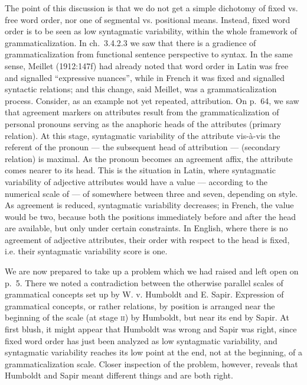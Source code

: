 The point of this discussion is that we do not get a simple dichotomy of fixed vs. free word order, nor one of segmental vs. positional means. Instead, fixed word order is to be seen as low syntagmatic variability, within the whole framework of grammaticalization. In ch.~3.4.2.3 we saw that there is a gradience of grammaticalization from functional sentence perspective to syntax. In the same sense, Meillet (1912:147f) had already noted that word order in Latin was free and signalled “expressive nuances”, while in French it was fixed and signalled syntactic relations; and this change, said Meillet, was a grammaticalization process. Consider, as an example not yet repeated, attribution. On p.~64, we saw that agreement markers on attributes result from the grammaticalization of personal pronouns serving as the anaphoric heads of the attributes (primary relation). At this stage, syntagmatic variability of the attribute vis-à-vis the referent of the pronoun — the subsequent head of attribution — (secondary relation) is maximal. As the pronoun becomes an agreement affix, the attribute comes nearer to its head. This is the situation in Latin, where syntagmatic variability of adjective attributes would have a value — according to the numerical scale of  — of somewhere between three and seven, depending on style. As agreement is reduced, syntagmatic variability decreases; in French, the value would be two, because both the positions immediately before and after the head are available, but only under certain constraints. In English, where there is no agreement of adjective attributes, their order with respect to the head is fixed, i.e. their syntagmatic variability score is one.

We are now prepared to take up a problem which we had raised and left open on p.~5. There we noted a contradiction between the otherwise parallel scales of grammatical concepts set up by W. v. Humboldt and E. Sapir. Expression of grammatical concepts, or rather relations, by position is arranged near the beginning of the scale (at stage \textsc{ii}) by Humboldt, but near its end by Sapir. At first blush, it might appear that Humboldt was wrong and Sapir was right, since fixed word order has just been analyzed as low syntagmatic variability, and syntagmatic variability reaches its low point at the end, not at the beginning, of a grammaticalization scale. Closer inspection of the problem, however, reveals that Humboldt and Sapir meant different things and are both right.


